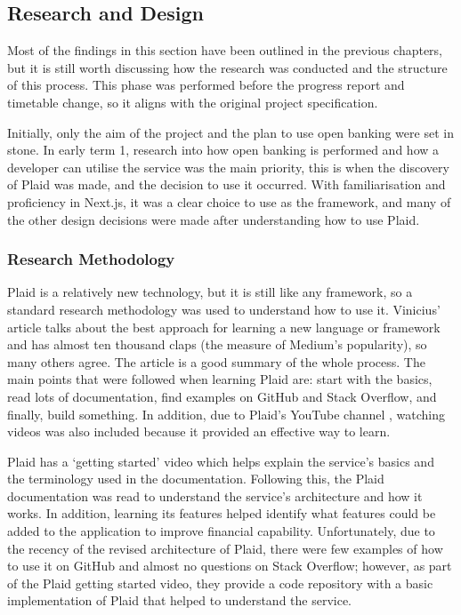 \subsection{Research and Design}
Most of the findings in this section have been outlined in the previous chapters, but it is still worth discussing how the research was conducted and the structure of this process. This phase was performed before the progress report and timetable change, so it aligns with the original project specification.

Initially, only the aim of the project and the plan to use open banking were set in stone. In early term 1, research into how open banking is performed and how a developer can utilise the service was the main priority, this is when the discovery of Plaid was made, and the decision to use it occurred. With familiarisation and proficiency in Next.js, it was a clear choice to use as the framework, and many of the other design decisions were made after understanding how to use Plaid.

\subsubsection{Research Methodology}
Plaid is a relatively new technology, but it is still like any framework, so a standard research methodology was used to understand how to use it. Vinicius' article \cite{FrameworkLearning} talks about the best approach for learning a new language or framework and has almost ten thousand claps (the measure of Medium's popularity), so many others agree. The article is a good summary of the whole process. The main points that were followed when learning Plaid are: start with the basics, read lots of documentation, find examples on GitHub and Stack Overflow, and finally, build something. In addition, due to Plaid's YouTube channel \cite{PlaidYouTube}, watching videos was also included because it provided an effective way to learn.

Plaid has a `getting started' video which helps explain the service's basics and the terminology used in the documentation. Following this, the Plaid documentation was read to understand the service's architecture and how it works. In addition, learning its features helped identify what features could be added to the application to improve financial capability. Unfortunately, due to the recency of the revised architecture of Plaid, there were few examples of how to use it on GitHub and almost no questions on Stack Overflow; however, as part of the Plaid getting started video, they provide a code repository with a basic implementation of Plaid that helped to understand the service.

